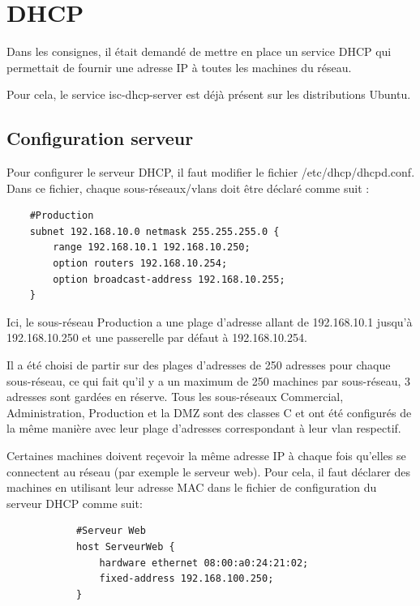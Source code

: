 \documentclass[a4paper,12pt,openany]{report}
\begin{document}
        \section{DHCP}
            Dans les consignes, il était demandé de mettre en place un service DHCP qui permettait de fournir une adresse IP à toutes les machines du réseau. 
            
            Pour cela, le service isc-dhcp-server est déjà présent sur les distributions Ubuntu.
            \subsection{Configuration serveur}
            Pour configurer le serveur DHCP, il faut modifier le fichier /etc/dhcp/dhcpd.conf. 
            Dans ce fichier, chaque sous-réseaux/vlans doit être déclaré comme suit :
                

    \begin{verbatim}
    #Production
    subnet 192.168.10.0 netmask 255.255.255.0 {
        range 192.168.10.1 192.168.10.250;
        option routers 192.168.10.254;
        option broadcast-address 192.168.10.255;
    }
    \end{verbatim}

                
            Ici, le sous-réseau Production a une plage d'adresse allant de 192.168.10.1 jusqu'à 192.168.10.250 et une passerelle par défaut à 192.168.10.254.

            Il a été choisi de partir sur des plages d'adresses de 250 adresses pour chaque sous-réseau, ce qui fait qu'il y a un maximum de 250 machines par sous-réseau, 3 adresses sont gardées en réserve.
            Tous les sous-réseaux Commercial, Administration, Production et la DMZ sont des classes C et ont été configurés de la même manière avec leur plage d'adresses correspondant à leur vlan respectif.

            Certaines machines doivent reçevoir la même adresse IP à chaque fois qu'elles se connectent au réseau (par exemple le serveur web).
            Pour cela, il faut déclarer des machines en utilisant leur adresse MAC dans le fichier de configuration du serveur DHCP comme suit:

            \begin{verbatim}
            #Serveur Web
            host ServeurWeb {
                hardware ethernet 08:00:a0:24:21:02;
                fixed-address 192.168.100.250;
            }
            \end{verbatim}
\end{document}

